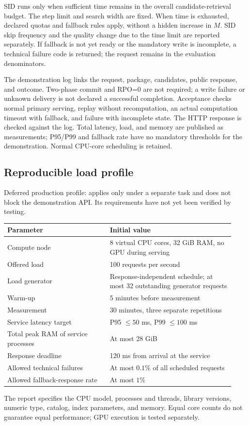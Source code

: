 \documentclass[12pt,a4paper]{article}
\theoremstyle{plainru}
\begin{document}
SID runs only when sufficient time remains in the overall candidate-retrieval
budget. The step limit and search width are fixed.
When time is exhausted, declared quotas and fallback rules apply,
without a hidden increase in $M$. SID skip frequency and the quality change
due to the time limit are reported separately.
If fallback is not yet ready or the mandatory write is incomplete,
a technical failure code is returned; the request remains
in the evaluation denominators.

The demonstration log links the request, package, candidates, public
response, and outcome. Two-phase commit and RPO=0 are not required; a write failure
or unknown delivery is not declared a successful completion.
Acceptance checks normal primary serving, replay without recomputation,
an actual computation timeout with fallback, and failure with incomplete state.
The HTTP response is checked against the log. Total latency, load, and memory
are published as measurements; P95/P99 and fallback rate have no mandatory
thresholds for the demonstration. Normal CPU-core scheduling is retained.

\subsection{Reproducible load profile}
\label{sec:ops-load-profile}

Deferred production profile: applies only under a separate task
and does not block the demonstration API. Its requirements have not yet been verified by testing.
\begin{center}
\begin{tabular}{p{0.42\linewidth}p{0.51\linewidth}}
\toprule
Parameter & Initial value\\
\midrule
Compute node & 8 virtual CPU cores, 32 GiB RAM,
no GPU during serving\\
Offered load & 100 requests per second\\
Load generator & Response-independent schedule;
at most 32 outstanding generator requests\\
Warm-up & 5 minutes before measurement\\
Measurement & 30 minutes, three separate repetitions\\
Service latency target & P95 $\le50$ ms, P99 $\le100$ ms\\
Total peak RAM of service processes & At most 28 GiB\\
Response deadline & 120 ms from arrival at the service\\
Allowed technical failures & At most $0.1\%$ of all scheduled requests\\
Allowed fallback-response rate & At most $1\%$\\
\bottomrule
\end{tabular}
\end{center}
The report specifies the CPU model, processes and threads, library versions,
numeric type, catalog, index parameters, and memory. Equal core counts
do not guarantee equal performance; GPU execution is tested separately.
\end{document}
